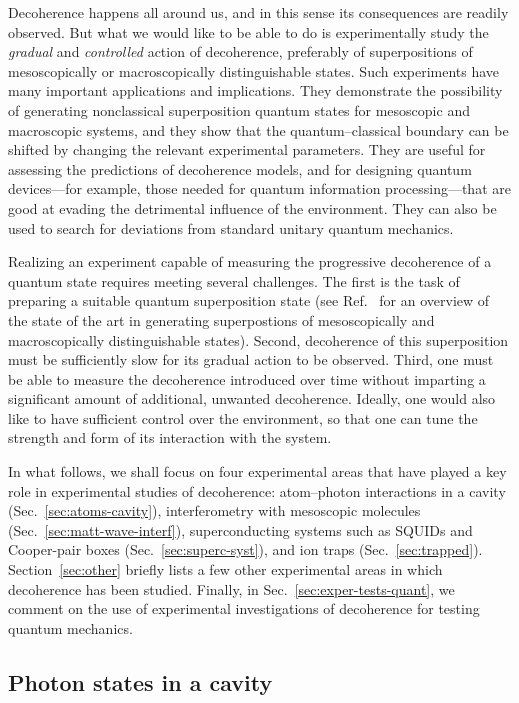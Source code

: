 \documentclass[3p,sort&compress,12pt]{elsarticle}
\begin{document}
Decoherence happens all around us, and in this sense its consequences are readily observed. But what we would like to be able to do is experimentally study the \emph{gradual} and \emph{controlled} action of decoherence, preferably of superpositions of mesoscopically or macroscopically distinguishable states. Such experiments have many important applications and implications. They demonstrate the possibility of generating nonclassical superposition quantum states for mesoscopic and macroscopic systems, and they show that the quantum--classical boundary can be shifted by changing the relevant experimental parameters. They are useful for assessing the predictions of decoherence models, and for designing quantum devices---for example, those needed for quantum information processing---that are good at evading the detrimental influence of the environment. They can also be used to search for deviations from standard unitary quantum mechanics.

Realizing an experiment capable of measuring the progressive decoherence of a quantum state requires meeting several challenges. The first is the task of preparing a suitable quantum superposition state (see Ref.~\cite{Arndt:2014:oo} for an overview of the state of the art in generating superpostions of mesoscopically and macroscopically distinguishable states). Second, decoherence of this superposition must be sufficiently slow for its gradual action to be observed.  Third, one must be able to measure the decoherence introduced over time without imparting a significant amount of additional, unwanted decoherence. Ideally, one would also like to have sufficient control over the environment, so that one can tune the strength and form of its interaction with the system.

In what follows, we shall focus on four experimental areas that have played a key role in experimental studies of decoherence: atom--photon interactions in a cavity (Sec.~\ref{sec:atoms-cavity}), interferometry with mesoscopic molecules (Sec.~\ref{sec:matt-wave-interf}), superconducting systems such as SQUIDs and Cooper-pair boxes (Sec.~\ref{sec:superc-syst}), and ion traps (Sec.~\ref{sec:trapped}). Section~\ref{sec:other} briefly lists a few other experimental areas in which decoherence has been studied. Finally, in Sec.~\ref{sec:exper-tests-quant}, we comment on the use of experimental investigations of decoherence for testing quantum mechanics.

\subsection{\label{sec:atoms-cavity}Photon states in a cavity}
\end{document}
